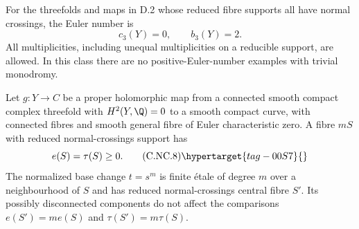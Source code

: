 
\begin{proposition}\hypertarget{tag-01GB}{}\label{cdp:st:D.2.4}



For the threefolds and maps in D.2 whose reduced fibre supports
all have normal crossings, the Euler number is
\[
c_3(Y)=0,\qquad b_3(Y)=2.
\]
All multiplicities, including unequal multiplicities on a
reducible support, are allowed. In this class there are no
positive-Euler-number examples with trivial monodromy.
\end{proposition}

\begin{proposition}\hypertarget{tag-01CA}{}\label{cdp:st:C.2.NC.3}


Let $g:Y\to C$ be a proper holomorphic map from a connected smooth compact complex threefold with $H^2(Y,\Q)=0$ to a smooth compact curve, with connected fibres and smooth general fibre of Euler characteristic zero. A fibre $mS$ with reduced normal-crossings support has
\[
 e(S)=\tau(S)\ge0.
 \tag{C.NC.8}\hypertarget{tag-00S7}{}\label{cdp:eq:C.NC.8}
\]
The normalized base change $t=s^m$ is finite étale of degree $m$ over a neighbourhood of $S$ and has reduced normal-crossings central fibre $S'$. Its possibly disconnected components do not affect the comparisons
$e(S')=m e(S)$ and $\tau(S')=m\tau(S)$.
\end{proposition}

